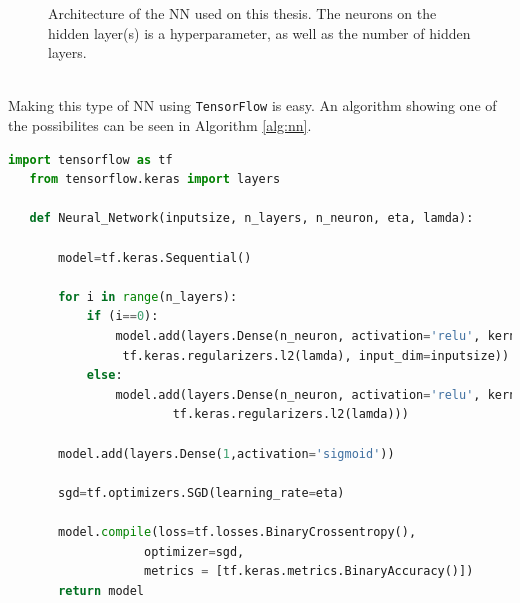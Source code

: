 \documentclass[12pt, a4paper]{book}
\begin{document}
\begin{figure}[!ht]
   \caption[Neural Network Architecture]{Architecture of the NN used on this thesis. 
   The neurons on the hidden layer(s) is a hyperparameter, as well as the number of hidden layers. }\label{fig:NNArch}
\end{figure}
\\Making this type of NN using \verb|TensorFlow| is easy. An algorithm showing one of the possibilites can be seen in Algorithm \ref{alg:nn}.
\begin{lstlisting}[language=Python, caption={Neural network definition using TensorFlow}, label=alg:nn, captionpos=t]
   import tensorflow as tf
   from tensorflow.keras import layers
   
   def Neural_Network(inputsize, n_layers, n_neuron, eta, lamda):
       
       model=tf.keras.Sequential()      
       
       for i in range(n_layers):       
           if (i==0):                  
               model.add(layers.Dense(n_neuron, activation='relu', kernel_regularizer=
                tf.keras.regularizers.l2(lamda), input_dim=inputsize))
           else:                       
               model.add(layers.Dense(n_neuron, activation='relu', kernel_regularizer=
                       tf.keras.regularizers.l2(lamda)))
                       
       model.add(layers.Dense(1,activation='sigmoid')) 
       
       sgd=tf.optimizers.SGD(learning_rate=eta)
       
       model.compile(loss=tf.losses.BinaryCrossentropy(),
                   optimizer=sgd,
                   metrics = [tf.keras.metrics.BinaryAccuracy()])
       return model
   \end{lstlisting}
\end{document}

